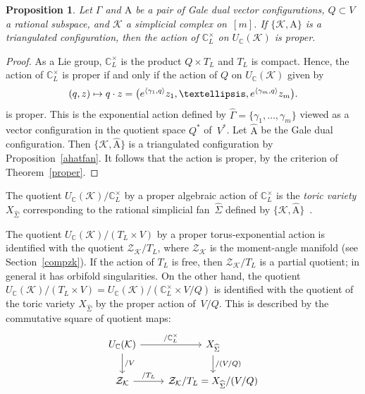 \documentclass[a4paper]{amsart}
\newtheorem{proposition}[theorem]{Proposition}
\theoremstyle{definition}
\theoremstyle{remark}
\numberwithin{equation}{section}
\def\C{\mathbb C}
\def\sK{\mathcal K}
\newcommand{\mb}[1]{{\textbf {\textit#1}}}
\newcommand{\zk}{\mathcal Z_{\mathcal K}}
\newcommand{\<}{\langle}
\renewcommand{\>}{\rangle}
\begin{document}

\begin{proposition}
Let $\Gamma$ and $\mathrm A$ be a pair of Gale dual vector configurations,  $Q\subset V$ a rational subspace, and $\sK$ a simplicial complex on~$[m]$. If 
$\{\sK,\mathrm A\}$ is a triangulated configuration, then the action of $\C^\times_L$ on $U_\C(\sK)$ is proper.
\end{proposition}
\begin{proof}
As a Lie group, $\C^\times_L$ is the product $Q\times T_L$ and $T_L$ is compact. Hence, the action of $\C^\times_L$ is proper if and only if the action of $Q$ on $U_\C(\sK)$ given by
\begin{equation}\label{qact}
  (\mb q,\mb z)\mapsto \mb q\cdot\mb z=
  \bigl(e^{\langle\gamma_1,\mb q\rangle}z_1,
  \ldots,e^{\langle\gamma_m,\mb q\rangle}z_m\bigr).
\end{equation}
is proper. This is the exponential action defined by $\widehat\Gamma=\{\gamma_1,\ldots,\gamma_m\}$ viewed as a vector configuration in the quotient space $Q^*$ of~$V^*$. Let $\widehat{\mathrm A}$ be the Gale dual configuration. Then $\{\sK,\widehat{\mathrm A}\}$ is a triangulated configuration by Proposition~\ref{ahatfan}. It follows that the action is proper, by the criterion of Theorem~\ref{proper}.
\end{proof}

The quotient $U_\C(\sK)/\C^\times_L$ by a proper algebraic action of 
$\C^\times_L$ is the \emph{toric variety} $X_{\widehat\Sigma}$ corresponding to the rational simplicial fan~$\widehat\Sigma$ defined by $\{\sK,\widehat{\mathrm A}\}$~\cite[\S5.1]{c-l-s11}. 

The quotient $U_\C(\sK)/(T_L\times V)$ by a proper torus-exponential action is identified with the quotient $\zk/T_L$, where $\zk$ is the moment-angle manifold (see Section~\ref{compzk}). If the action of  $T_L$ is free, then $\zk/T_L$ is a partial quotient; in general it has orbifold singularities.
On the other hand, the quotient $U_\C(\sK)/(T_L\times V)=U_\C(\sK)/(\C^\times_L\times V/Q)$ is identified with the quotient of the toric variety $X_{\widehat\Sigma}$ by the proper action of~$V/Q$. This is described by the commutative square of quotient maps:
\[
\begin{tikzcd}
  U_\C(\sK) \ar{r}{/\C^\times_L} \ar{d}{/V} 
   & X_{\widehat\Sigma} \ar{d}{/(V/Q)}\\
  \zk \ar{r}{/T_L} & \zk/T_L=X_{\widehat\Sigma}/(V/Q)
\end{tikzcd}
\]
\end{document}
